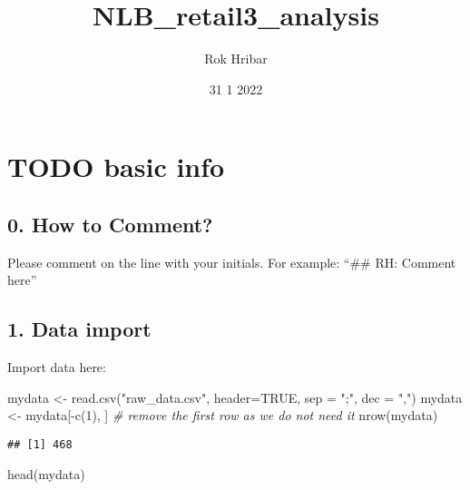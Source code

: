 \documentclass[
]{article}
\title{NLB\_retail3\_analysis}
\author{Rok Hribar}
\date{31 1 2022}
\newenvironment{Shaded}{\begin{snugshade}}{\end{snugshade}}
\newcommand{\AttributeTok}[1]{\textcolor[rgb]{0.77,0.63,0.00}{#1}}
\newcommand{\CommentTok}[1]{\textcolor[rgb]{0.56,0.35,0.01}{\textit{#1}}}
\newcommand{\ConstantTok}[1]{\textcolor[rgb]{0.00,0.00,0.00}{#1}}
\newcommand{\DecValTok}[1]{\textcolor[rgb]{0.00,0.00,0.81}{#1}}
\newcommand{\FunctionTok}[1]{\textcolor[rgb]{0.00,0.00,0.00}{#1}}
\newcommand{\NormalTok}[1]{#1}
\newcommand{\OtherTok}[1]{\textcolor[rgb]{0.56,0.35,0.01}{#1}}
\newcommand{\SpecialCharTok}[1]{\textcolor[rgb]{0.00,0.00,0.00}{#1}}
\newcommand{\StringTok}[1]{\textcolor[rgb]{0.31,0.60,0.02}{#1}}
\begin{document}
\maketitle

\hypertarget{todo-basic-info}{%
\section{TODO basic info}\label{todo-basic-info}}

\hypertarget{how-to-comment}{%
\subsection{0. How to Comment?}\label{how-to-comment}}

Please comment on the line with your initials. For example: ``\#\# RH:
Comment here''

\hypertarget{data-import}{%
\subsection{1. Data import}\label{data-import}}

Import data here:

\begin{Shaded}
\begin{Highlighting}[]
\NormalTok{mydata }\OtherTok{\textless{}{-}} \FunctionTok{read.csv}\NormalTok{(}\StringTok{"raw\_data.csv"}\NormalTok{, }\AttributeTok{header=}\ConstantTok{TRUE}\NormalTok{, }\AttributeTok{sep =} \StringTok{";"}\NormalTok{, }\AttributeTok{dec =} \StringTok{","}\NormalTok{)}
\NormalTok{mydata }\OtherTok{\textless{}{-}}\NormalTok{ mydata[}\SpecialCharTok{{-}}\FunctionTok{c}\NormalTok{(}\DecValTok{1}\NormalTok{), ] }\CommentTok{\# remove the first row as we do not need it}
\FunctionTok{nrow}\NormalTok{(mydata)}
\end{Highlighting}
\end{Shaded}

\begin{verbatim}
## [1] 468
\end{verbatim}

\begin{Shaded}
\begin{Highlighting}[]
\FunctionTok{head}\NormalTok{(mydata)}
\end{Highlighting}
\end{Shaded}
\end{document}
